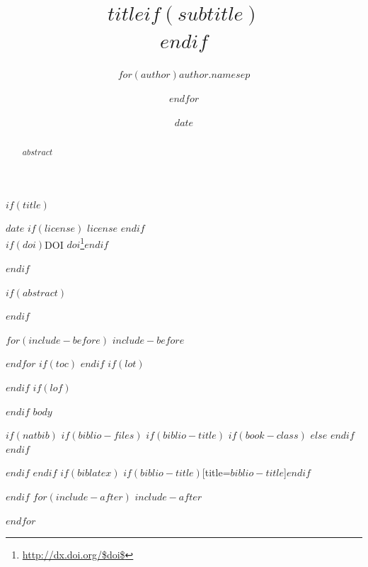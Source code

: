 \documentclass[$if(fontsize)$$fontsize$,$endif$$if(lang)$$lang$,$endif$$if(papersize)$$papersize$,$endif$$for(classoption)$$classoption$$sep$,$endfor$]{$documentclass$}
\title{$title$$if(subtitle)$\\\vspace{0.5em}{\large $subtitle$}$endif$}
\author{$for(author)$$author.name$$sep$ \and $endfor$}
\date{$date$}
\renewcommand{\href}[2]{#2\footnote{\url{#1}}}
\begin{document}
\thispagestyle{plain}

$if(title)$
\null
\vskip 6mm
{}%

$date$ $if(license)$ $license$ $endif$\\
$if(doi)$DOI \href{http://dx.doi.org/$doi$}{$doi$}$endif$

$endif$%

$if(abstract)$
\begin{abstract}
$abstract$
\end{abstract}
$endif$

$for(include-before)$
$include-before$

$endfor$
$if(toc)$
{
\hypersetup{linkcolor=black}
\setcounter{tocdepth}{$toc-depth$}
\tableofcontents
}
$endif$
$if(lot)$
\listoftables
$endif$
$if(lof)$
\listoffigures
$endif$
$body$

$if(natbib)$
$if(biblio-files)$
$if(biblio-title)$
$if(book-class)$
\renewcommand\bibname{$biblio-title$}
$else$
\renewcommand\refname{$biblio-title$}
$endif$
$endif$


$endif$
$endif$
$if(biblatex)$
\printbibliography$if(biblio-title)$[title=$biblio-title$]$endif$

$endif$
$for(include-after)$
$include-after$

$endfor$
\end{document}
